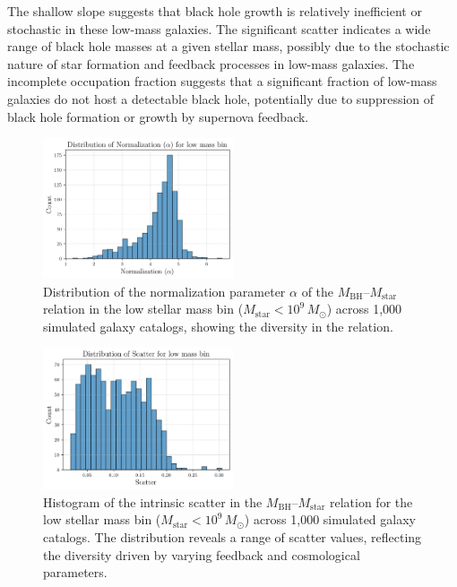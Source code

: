 \documentclass[twocolumn]{aastex631}
\begin{document}
The shallow slope suggests that black hole growth is relatively inefficient or stochastic in these low-mass galaxies. The significant scatter indicates a wide range of black hole masses at a given stellar mass, possibly due to the stochastic nature of star formation and feedback processes in low-mass galaxies. The incomplete occupation fraction suggests that a significant fraction of low-mass galaxies do not host a detectable black hole, potentially due to suppression of black hole formation or growth by supernova feedback.

\begin{figure}[ht!]
    \centering
    \includegraphics[width=0.5\textwidth]{plots/dist_alpha_low_1_20250423_182517.png}
    \caption{Distribution of the normalization parameter $\alpha$ of the $M_\mathrm{BH}$--$M_\mathrm{star}$ relation in the low stellar mass bin ($M_\mathrm{star}<10^9\,M_\odot$) across 1,000 simulated galaxy catalogs, showing the diversity in the relation.
}
    \label{fig:dist_alpha_low}
\end{figure}

\begin{figure}[ht!]
    \centering
    \includegraphics[width=0.5\textwidth]{plots/dist_scatter_low_2_20250423_182518.png}
    \caption{Histogram of the intrinsic scatter in the $M_\mathrm{BH}$--$M_\mathrm{star}$ relation for the low stellar mass bin ($M_\mathrm{star}<10^9\,M_\odot$) across 1,000 simulated galaxy catalogs. The distribution reveals a range of scatter values, reflecting the diversity driven by varying feedback and cosmological parameters.
}
    \label{fig:dist_scatter_low}
\end{figure}
\end{document}
